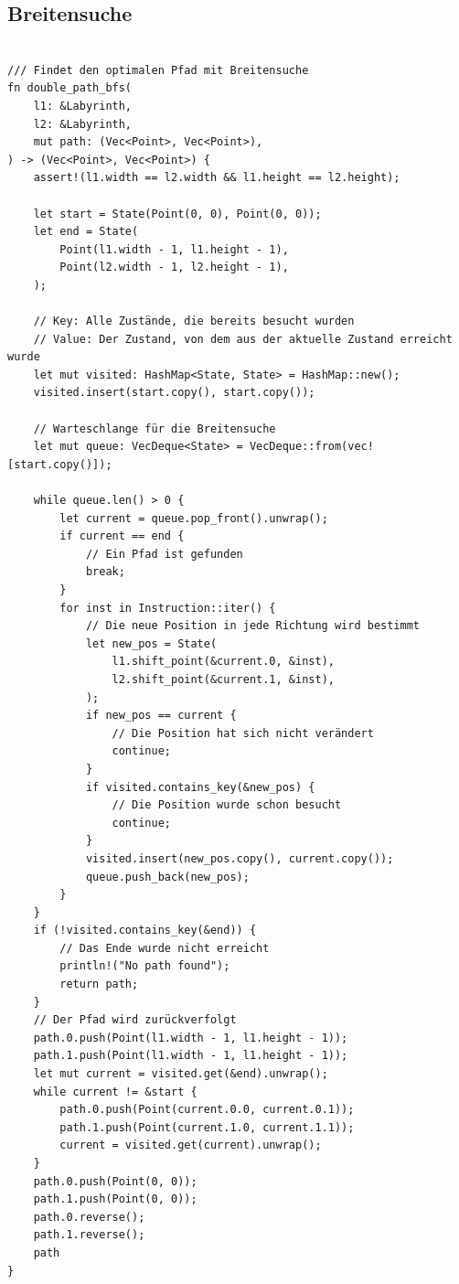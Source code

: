 \documentclass[a4paper,10pt,ngerman]{scrartcl}
\begin{document}
    \subsection{Breitensuche}
    \begin{verbatim}

/// Findet den optimalen Pfad mit Breitensuche
fn double_path_bfs(
    l1: &Labyrinth,
    l2: &Labyrinth,
    mut path: (Vec<Point>, Vec<Point>),
) -> (Vec<Point>, Vec<Point>) {
    assert!(l1.width == l2.width && l1.height == l2.height);

    let start = State(Point(0, 0), Point(0, 0));
    let end = State(
        Point(l1.width - 1, l1.height - 1),
        Point(l2.width - 1, l2.height - 1),
    );

    // Key: Alle Zustände, die bereits besucht wurden
    // Value: Der Zustand, von dem aus der aktuelle Zustand erreicht wurde
    let mut visited: HashMap<State, State> = HashMap::new();
    visited.insert(start.copy(), start.copy());

    // Warteschlange für die Breitensuche
    let mut queue: VecDeque<State> = VecDeque::from(vec![start.copy()]);

    while queue.len() > 0 {
        let current = queue.pop_front().unwrap();
        if current == end {
            // Ein Pfad ist gefunden
            break;
        }
        for inst in Instruction::iter() {
            // Die neue Position in jede Richtung wird bestimmt
            let new_pos = State(
                l1.shift_point(&current.0, &inst),
                l2.shift_point(&current.1, &inst),
            );
            if new_pos == current {
                // Die Position hat sich nicht verändert
                continue;
            }
            if visited.contains_key(&new_pos) {
                // Die Position wurde schon besucht
                continue;
            }
            visited.insert(new_pos.copy(), current.copy());
            queue.push_back(new_pos);
        }
    }
    if (!visited.contains_key(&end)) {
        // Das Ende wurde nicht erreicht
        println!("No path found");
        return path;
    }
    // Der Pfad wird zurückverfolgt
    path.0.push(Point(l1.width - 1, l1.height - 1));
    path.1.push(Point(l1.width - 1, l1.height - 1));
    let mut current = visited.get(&end).unwrap();
    while current != &start {
        path.0.push(Point(current.0.0, current.0.1));
        path.1.push(Point(current.1.0, current.1.1));
        current = visited.get(current).unwrap();
    }
    path.0.push(Point(0, 0));
    path.1.push(Point(0, 0));
    path.0.reverse();
    path.1.reverse();
    path
}
    \end{verbatim}
\end{document}
